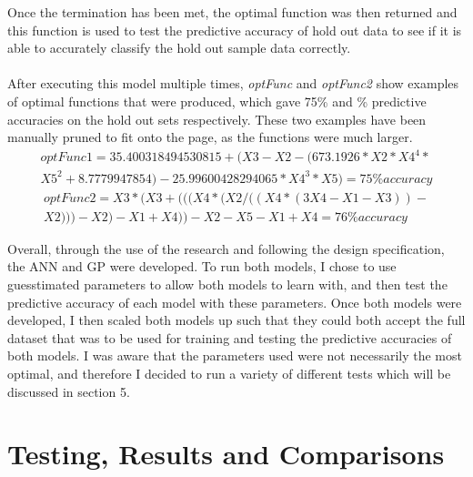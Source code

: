 \documentclass[11pt]{article}
\begin{document}
Once the termination has been met, the optimal function was then returned and this function is used to test the predictive accuracy of hold out data to see if it is able to accurately classify the hold out sample data correctly. \\\\
After executing this model multiple times, \textit{optFunc} and \textit{optFunc2} show examples of optimal functions that were produced, which gave 75\% and \% predictive accuracies on the hold out sets respectively.  These two examples have been manually pruned to fit onto the page, as the functions were much larger. 
\begin{align*}
optFunc1=  35.400318494530815+(X3-X2-(673.1926*X2*X4^4*\\
X5^2+8.7779947854)-25.99600428294065*X4^3*X5) = 75\%  accuracy
\end{align*}
\begin{align*}
optFunc2 = X3*(X3+(((X4*(X2/((X4*(3X4-X1-X3))-\\
X2)))-X2)-X1+X4))-X2-X5-X1+X4 = 76\%  accuracy
\end{align*}

Overall, through the use of the research and following the design specification, the ANN and GP were developed. To run both models, I chose to use guesstimated parameters to allow both models to learn with, and then test the predictive accuracy of each model with these parameters. Once both models were developed, I then scaled both models up such that they could both accept the full dataset that was to be used for training and testing the predictive accuracies of both models. I was aware that the parameters used were not necessarily the most optimal, and therefore I decided to run a variety of different tests which will be discussed in section 5. 
\section{Testing, Results and Comparisons} %
\end{document}
